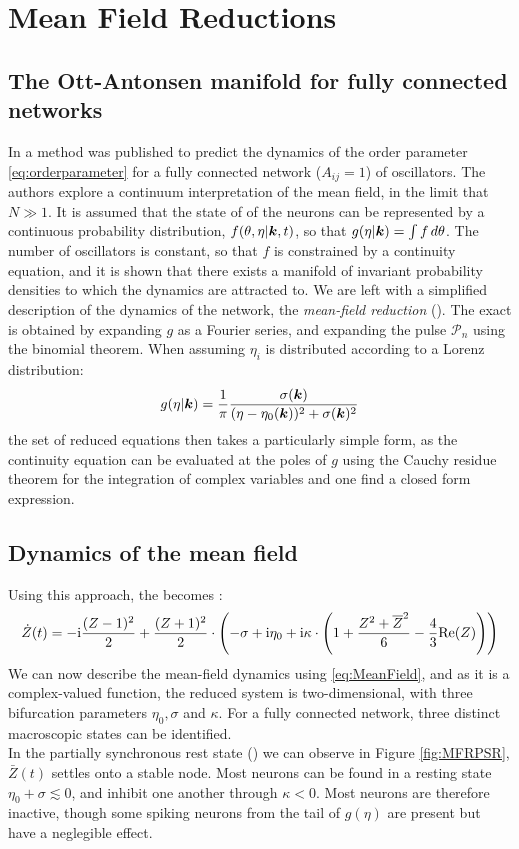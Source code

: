 \newpage
\section{Mean Field Reductions}
\subsection{The Ott-Antonsen manifold for fully connected networks}
In \cite{OttAntonsen2008, OttAntonsen2009, OttAntonsen2010} a method was published to predict the dynamics of the order parameter \eqref{eq:orderparameter} for a fully connected network ($A_{ij} = 1$) of oscillators. The authors explore a continuum interpretation of the mean field, in the limit that  $N \gg 1$. It is assumed that the state of of the neurons can be represented by a continuous probability distribution, $f(\theta, \eta \rvert {\boldsymbol{k}}, t)$, so that $g(\eta \rvert {\boldsymbol{k}}) = \int f \mathop{d\theta}$. The number of oscillators is constant, so that $f$ is constrained by a continuity equation, and it is shown that there exists a manifold of invariant probability densities to which the dynamics are attracted to. We are left with a simplified description of the dynamics of the network, the \textsl{mean-field reduction} (\MFR). The exact \MFR is obtained by expanding $g$ as a Fourier series, and expanding the pulse $\mathcal{P}_n$ using the binomial theorem. When assuming $\eta_i$ is distributed according to a Lorenz distribution:
\begin{align}
g(\eta | {\boldsymbol{k}})=\frac{1}{\pi} \frac{\sigma({\boldsymbol{k}})}{(\eta-\eta_{0}({\boldsymbol{k}}))^{2}+\sigma({\boldsymbol{k}})^{2}} \label{eq:Lorentzpdf}
\end{align}
the set of reduced equations then takes a particularly simple form, as the continuity equation can be evaluated at the poles of $g$ using the Cauchy residue theorem for the integration of complex variables and one find a closed form expression.


\subsection{Dynamics of the mean field}
Using this approach, the \MFR becomes \cite{Luke2013, Martens2020}:
\begin{align}
\dot{Z}(t)= -\ic \frac{(Z-1)^2}{2}+\frac{(Z+1)^2}{2} \cdot \left(-\sigma+ \ic\eta_{0}
+ \ic \kappa \cdot \left(1+\frac{Z^{2} + \overline{Z}^{2} }{6} - \frac{4}{3} \Re(Z)\right)\right) \label{eq:MeanField}
\end{align}
We can now describe the mean-field dynamics using \eqref{eq:MeanField}, and as it is a complex-valued function, the reduced system is two-dimensional, with three bifurcation parameters $\eta_0, \sigma$ and $\kappa$. For a fully connected network, three distinct macroscopic states can be identified.\\
In the partially synchronous rest state (\PSR) we can observe in Figure \ref{fig:MFRPSR}, $\bar{Z}(t)$ settles onto a stable node. Most neurons can be found in a resting state $\eta_0 + \sigma \lesssim 0$, and inhibit one another through $\kappa < 0$. Most neurons are therefore inactive, though some spiking neurons from the tail of $g(\eta)$ are present but have a neglegible effect. \\

